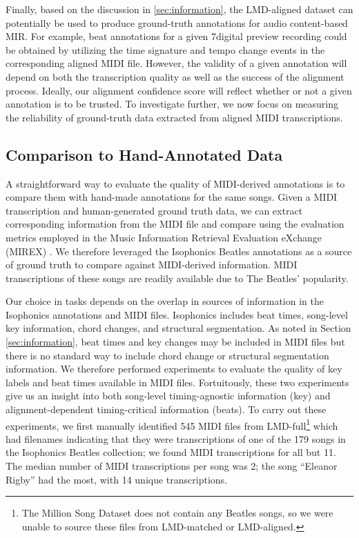 Finally, based on the discussion in \cref{sec:information}, the LMD-aligned dataset can potentially be used to produce ground-truth annotations for audio content-based MIR.
For example, beat annotations for a given 7digital preview recording could be obtained by utilizing the time signature and tempo change events in the corresponding aligned MIDI file.
However, the validity of a given annotation will depend on both the transcription quality as well as the success of the alignment process.
Ideally, our alignment confidence score will reflect whether or not a given annotation is to be trusted.
To investigate further, we now focus on measuring the reliability of ground-truth data extracted from aligned MIDI transcriptions.

\subsection{Comparison to Hand-Annotated Data}
\label{sec:reliability}

A straightforward way to evaluate the quality of MIDI-derived annotations is to compare them with hand-made annotations for the same songs.
Given a MIDI transcription and human-generated ground truth data, we can extract corresponding information from the MIDI file and compare using the evaluation metrics employed in the Music Information Retrieval Evaluation eXchange (MIREX) \cite{downie2008music}.
We therefore leveraged the Isophonics Beatles annotations \cite{mauch2009omras2} as a source of ground truth to compare against MIDI-derived information.  MIDI transcriptions of these songs are readily available due to The Beatles' popularity.

Our choice in tasks depends on the overlap in sources of information in the Isophonics annotations and MIDI files.
Isophonics includes beat times, song-level key information, chord changes, and structural segmentation.
As noted in Section \ref{sec:information}, beat times and key changes may be included in MIDI files but there is no standard way to include chord change or structural segmentation information.
We therefore performed experiments to evaluate the quality of key labels and beat times available in MIDI files.
Fortuitously, these two experiments give us an insight into both song-level timing-agnostic information (key) and alignment-dependent timing-critical information (beats).
To carry out these experiments, we first manually identified 545 MIDI files from LMD-full\footnote{The Million Song Dataset does not contain any Beatles songs, so we were unable to source these files from LMD-matched or LMD-aligned.} which had filenames indicating that they were transcriptions of one of the 179 songs in the Isophonics Beatles collection; we found MIDI transcriptions for all but 11.
The median number of MIDI transcriptions per song was 2; the song ``Eleanor Rigby'' had the most, with 14 unique transcriptions.

